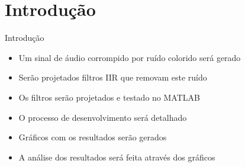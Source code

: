 \section{Introdução}
\begin{frame}{Introdução}
\begin{itemize}
    \item Um sinal de áudio corrompido por ruído colorido será gerado
	\item Serão projetados filtros IIR que removam este ruído
	\item Os filtros serão projetados e testado no MATLAB
	\item O processo de desenvolvimento será detalhado
	\item Gráficos com os resultados serão gerados
	\item A análise dos resultados será feita através dos gráficos 
\end{itemize}
	
\end{frame}